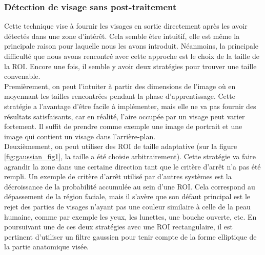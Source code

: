 \documentclass[a4paper,11pt]{article}
\begin{document}
\subsubsection{Détection de visage sans post-traitement}
Cette technique vise à fournir les visages en sortie directement après les avoir détectés dans une zone d'intérêt.
Cela semble être intuitif, elle est même la principale raison pour laquelle nous les avons introduit.
Néanmoins, la principale difficulté que nous avons rencontré avec cette approche est le choix de la taille de la ROI.
Encore une fois, il semble y avoir deux stratégies pour trouver une taille convenable.\\
\newline
Premièrement, on peut l'intuiter à partir des dimensions de l'image où en moyennant les tailles rencontrées pendant la phase d'apprentissage.
Cette stratégie a l'avantage d'être facile à implémenter, mais elle ne va pas fournir des résultats satisfaisants, car en réalité, l'aire occupée par un visage peut varier fortement.
Il suffit de prendre comme exemple une image de portrait et une image qui contient un visage dans l'arrière-plan.\\
\newline
Deuxièmement, on peut utiliser des ROI de taille adaptative (sur la figure \ref{fig:gaussian_fig1}, la taille a été choisie arbitrairement).
Cette stratégie va faire agrandir la zone dans une certaine direction tant que le critère d'arrêt n'a pas été rempli.
Un exemple de critère d'arrêt utilisé par d'autres systèmes est la décroissance de la probabilité accumulée au sein d'une ROI.
Cela correspond au dépassement de la région faciale, mais il s'avère que son défaut principal est le rejet des parties de visages n'ayant pas une couleur similaire à celle de la peau humaine, comme par exemple les yeux, les lunettes, une bouche ouverte, etc.
\newline
\newline
En poursuivant une de ces deux stratégies avec une ROI rectangulaire, il est
pertinent d'utiliser un filtre gaussien pour tenir compte de la forme elliptique
de la partie anatomique visée.
\end{document}
